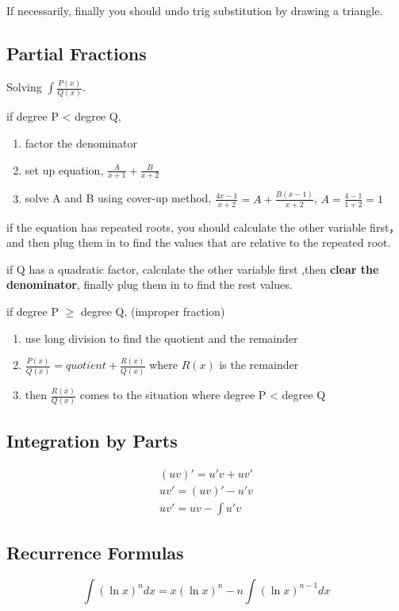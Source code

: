 \documentclass{article}
\begin{document}
If necessarily, finally you should undo trig substitution by drawing a triangle.

\subsection{Partial Fractions}
Solving $\int\frac{P(x)}{Q(x)}$.

if degree P < degree Q, 
\begin{enumerate}
  \item factor the denominator
  \item set up equation, $\frac{A}{x+1} + \frac{B}{x+2}$
  \item solve A and B using cover-up method, $\frac{4x-1}{x+2} = A + \frac{B(x-1)}{x+2}$, $A = \frac{4-1}{1+2} = 1$
\end{enumerate}

if the equation has repeated roots, you should calculate the other variable first， and then plug them in to find the values that are relative to the repeated root.

if Q has a quadratic factor, calculate the other variable first ,then \textbf{clear the denominator}, finally plug them in to find the rest values.

if degree P $\ge$ degree Q, (improper fraction)
\begin{enumerate}
  \item use long division to find the quotient and the remainder
  \item $\frac{P(x)}{Q(x)} = quotient + \frac{R(x)}{Q(x)}$ where $R(x)$ is the remainder
  \item then $\frac{R(x)}{Q(x)}$ comes to the situation where degree P < degree Q
\end{enumerate}

\subsection{Integration by Parts}
\begin{gather*}
  (uv)' = u'v + uv' \\
  uv' = (uv)' - u'v \\
  uv' = uv - \int u'v
\end{gather*}

\subsection{Recurrence Formulas}
$$ \int(\ln x)^ndx = x(\ln x)^{n} - n\int (\ln x)^{n-1}dx$$
\end{document}
